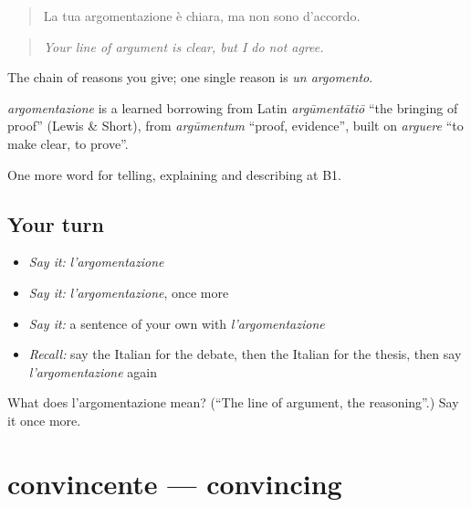 \begin{quote}
La tua argomentazione è chiara, ma non sono d'accordo.
\end{quote}

\begin{quote}
\emph{Your line of argument is clear, but I do not agree.}
\end{quote}

The chain of reasons you give; one single reason is \emph{un argomento}.

\begin{cousinweb}
\emph{argomentazione} is a learned borrowing from Latin \emph{argūmentātiō} \textquotedblleft{}the bringing of proof\textquotedblright{} (Lewis \& Short), from \emph{argūmentum} \textquotedblleft{}proof, evidence\textquotedblright{}, built on \emph{arguere} \textquotedblleft{}to make clear, to prove\textquotedblright{}.
\end{cousinweb}

\begin{grammarlens}[title={What you've built}]
One more word for telling, explaining and describing at B1.
\end{grammarlens}

\subsection*{Your turn}
\begin{itemize}
\raggedright
  \item \emph{Say it:} \emph{l'argomentazione}
  \item \emph{Say it:} \emph{l'argomentazione}, once more
  \item \emph{Say it:} a sentence of your own with \emph{l'argomentazione}
  \item \emph{Recall:} say the Italian for the debate, then the Italian for the thesis, then say \emph{l'argomentazione} again
\end{itemize}

\begin{tcolorbox}[breakable,colback=teal!4,colframe=teal!35!black,title={Before you move on}]
What does l'argomentazione mean? (\textquotedblleft{}The line of argument, the reasoning\textquotedblright{}.) Say it once more.
\end{tcolorbox}
\section[convincente]{convincente — convincing}

